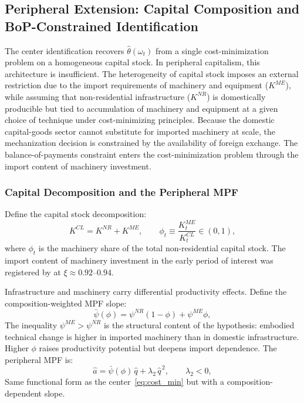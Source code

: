 \subsection{Peripheral Extension: Capital Composition and BoP-Constrained Identification}
\label{subsec:theta_identification_chile}

The center identification recovers $\hat{\theta}(\omega_t)$ from a
single cost-minimization problem on a homogeneous capital stock. In
peripheral capitalism, this architecture is insufficient. The
heterogeneity of capital stock imposes an external restriction due to
the import requirements of machinery and equipment ($K^{ME}$), while
assuming that non-residential infrastructure ($K^{NR}$) is domestically
producible but tied to accumulation of machinery and equipment at a
given choice of technique under cost-minimizing principles. Because the
domestic capital-goods sector cannot substitute for imported machinery
at scale, the mechanization decision is constrained by the availability
of foreign exchange. The balance-of-payments constraint enters the
cost-minimization problem through the import content of machinery
investment.

\subsubsection{Capital Decomposition and the Peripheral MPF}
\label{subsec:chile_mpf}

Define the capital stock decomposition:
%
\begin{equation}
	K^{CL} = K^{NR} + K^{ME},
	\qquad
	\phi_t \equiv \frac{K_t^{ME}}{K_t^{CL}} \in (0,1),
	\label{eq:cl:capital_decomp}
\end{equation}
%
where $\phi_t$ is the machinery share of the total non-residential
capital stock. The import content of machinery investment in the early period of interest was registered by 
\citet{Kaldor1959} at $\xi \approx 0.92$--$0.94$. 

Infrastructure and machinery carry differential productivity effects.
Define the composition-weighted MPF slope:
%
\begin{equation}
	\bar{\psi}(\phi)
	=
	\psi^{NR}(1-\phi)+\psi^{ME}\phi,
	\label{eq:cl:psi_bar}
\end{equation}
%
The inequality $\psi^{ME} > \psi^{NR}$ is the structural
content of the \citet{Kaldor1959} hypothesis: embodied technical change is
higher in imported machinery than in domestic infrastructure. Higher
$\phi$ raises productivity potential but deepens import dependence.
The peripheral MPF is:
%
\begin{equation}
	\hat{a}
	=
	\bar{\psi}(\phi)\,\hat{q}
	+
	\lambda_2\,\hat{q}^{\,2},
	\qquad
	\lambda_2 < 0,
	\label{eq:cl:mpf}
\end{equation}
%
Same functional form as the center~\eqref{eq:cost_min} but with a
composition-dependent slope.

